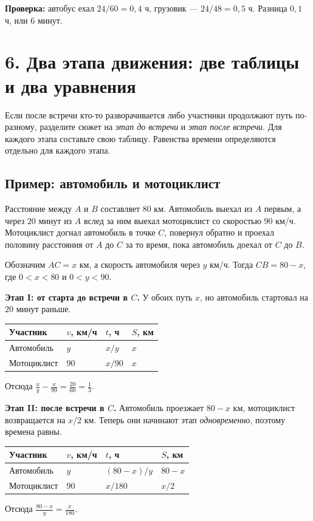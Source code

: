 \documentclass[a4paper,12pt]{article}
\newcommand{\key}[1]{\textcolor{darkaccent}{\textbf{#1}}}
\begin{document}
\key{Проверка:} автобус ехал $24/60=0{,}4$ ч, грузовик --- $24/48=0{,}5$ ч. Разница $0{,}1$ ч, или $6$ минут.

\clearpage
\section*{6. Два этапа движения: две таблицы и два уравнения}

Если после встречи кто-то разворачивается либо участники продолжают путь по-разному, разделите сюжет на \emph{этап до встречи} и \emph{этап после встречи}. Для каждого этапа составьте свою таблицу. Равенства времени определяются отдельно для каждого этапа.

\subsection*{Пример: автомобиль и мотоциклист}

Расстояние между $A$ и $B$ составляет $80$ км. Автомобиль выехал из $A$ первым, а через $20$ минут из $A$ вслед за ним выехал мотоциклист со скоростью $90$ км/ч. Мотоциклист догнал автомобиль в точке $C$, повернул обратно и проехал половину расстояния от $A$ до $C$ за то время, пока автомобиль доехал от $C$ до $B$.

Обозначим $AC=x$ км, а скорость автомобиля через $y$ км/ч. Тогда $CB=80-x$, где $0<x<80$ и $0<y<90$.

\textbf{Этап I: от старта до встречи в $C$.} У обоих путь $x$, но автомобиль стартовал на $20$ минут раньше.
\begin{center}
\renewcommand{\arraystretch}{1.32}
\begin{tabularx}{\linewidth}{@{}lXXX@{}}
\toprule
Участник & $v$, км/ч & $t$, ч & $S$, км\\
\midrule
Автомобиль & $y$ & $x/y$ & $x$\\
Мотоциклист & $90$ & $x/90$ & $x$\\
\bottomrule
\end{tabularx}
\end{center}
Отсюда $\displaystyle\frac{x}{y}-\frac{x}{90}=\frac{20}{60}=\frac13$.

\textbf{Этап II: после встречи в $C$.} Автомобиль проезжает $80-x$ км, мотоциклист возвращается на $x/2$ км. Теперь они начинают этап \emph{одновременно}, поэтому времена равны.
\begin{center}
\renewcommand{\arraystretch}{1.32}
\begin{tabularx}{\linewidth}{@{}lXXX@{}}
\toprule
Участник & $v$, км/ч & $t$, ч & $S$, км\\
\midrule
Автомобиль & $y$ & $(80-x)/y$ & $80-x$\\
Мотоциклист & $90$ & $x/180$ & $x/2$\\
\bottomrule
\end{tabularx}
\end{center}
Отсюда $\displaystyle\frac{80-x}{y}=\frac{x}{180}$.
\end{document}
